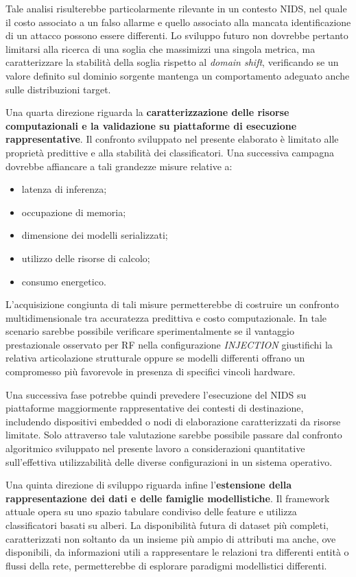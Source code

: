 Tale analisi risulterebbe particolarmente rilevante in un contesto NIDS, nel quale il costo associato a un falso allarme e quello associato alla mancata identificazione di un attacco possono essere differenti.
Lo sviluppo futuro non dovrebbe pertanto limitarsi alla ricerca di una soglia che massimizzi una singola metrica, ma caratterizzare la stabilità della soglia rispetto al \textit{domain shift}, verificando se un valore definito sul dominio sorgente mantenga un comportamento adeguato anche sulle distribuzioni target.

Una quarta direzione riguarda la \textbf{caratterizzazione delle risorse computazionali e la validazione su piattaforme di esecuzione rappresentative}.
Il confronto sviluppato nel presente elaborato è limitato alle proprietà predittive e alla stabilità dei classificatori.
Una successiva campagna dovrebbe affiancare a tali grandezze misure relative a:
\begin{itemize}
    \item latenza di inferenza;
    \item occupazione di memoria;
    \item dimensione dei modelli serializzati;
    \item utilizzo delle risorse di calcolo;
    \item consumo energetico.
\end{itemize}

L'acquisizione congiunta di tali misure permetterebbe di costruire un confronto multidimensionale tra accuratezza predittiva e costo computazionale.
In tale scenario sarebbe possibile verificare sperimentalmente se il vantaggio prestazionale osservato per RF nella configurazione \textit{INJECTION} giustifichi la relativa articolazione strutturale oppure se modelli differenti offrano un compromesso più favorevole in presenza di specifici vincoli hardware.

Una successiva fase potrebbe quindi prevedere l'esecuzione del NIDS su piattaforme maggiormente rappresentative dei contesti di destinazione, includendo dispositivi embedded o nodi di elaborazione caratterizzati da risorse limitate.
Solo attraverso tale valutazione sarebbe possibile passare dal confronto algoritmico sviluppato nel presente lavoro a considerazioni quantitative sull'effettiva utilizzabilità delle diverse configurazioni in un sistema operativo.

Una quinta direzione di sviluppo riguarda infine l'\textbf{estensione della rappresentazione dei dati e delle famiglie modellistiche}.
Il framework attuale opera su uno spazio tabulare condiviso delle feature e utilizza classificatori basati su alberi.
La disponibilità futura di dataset più completi, caratterizzati non soltanto da un insieme più ampio di attributi ma anche, ove disponibili, da informazioni utili a rappresentare le relazioni tra differenti entità o flussi della rete, permetterebbe di esplorare paradigmi modellistici differenti.

